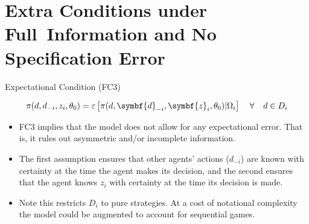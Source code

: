 \section{Extra Conditions under Full\ Information and No Specification Error}
\begin{frame}{Expectational Condition (FC3)}

\begin{equation*}
\pi (d,d_{-i},z_{i},\theta _{0})=\varepsilon \left[ \pi (d,\symbf{d}%
_{-i},\symbf{z}_{i},\theta _{0})| \Omega_i \right] \text{ \hspace{0.1in}} \forall  \text{ \hspace{0.1in}} d\in D_{i}
\end{equation*}
\begin{itemize}
\item FC3 implies that the model does not allow for any expectational error. That
is, it rules out asymmetric and/or incomplete information.
\item The first assumption ensures that other agents' actions ($d_{-i}$) are known with certainty at the time
the agent makes its decision, and the second ensures that the agent knows $z_{i}$ with certainty at the time its decision is made. 
\item  Note this restricts $D_i$ to pure strategies.  At a cost of notational complexity the model could be augmented to account for sequential games.
\end{itemize}
\end{frame}

